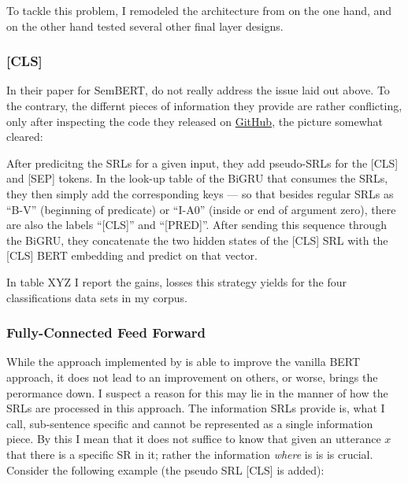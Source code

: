 To tackle this problem, I remodeled the architecture from \cite{zhang2019semantics} on the one hand, and on the other hand tested several other final layer designs.

\subsubsection{[CLS]}

In their paper for SemBERT, \cite{zhang2019semantics} do not really address the issue laid out above.
To the contrary, the differnt pieces of information they provide are rather conflicting, only after inspecting the code they released on \href{https://github.com/cooelf/SemBERT/}{GitHub}, the picture somewhat cleared:

After predicitng the SRLs for a given input, they add pseudo-SRLs for the [CLS] and [SEP] tokens.
In the look-up table of the BiGRU that consumes the SRLs, they then simply add the corresponding keys --- so that besides regular SRLs as ``B-V'' (beginning of predicate) or ``I-A0'' (inside or end of argument zero), there are also the labels ``[CLS]'' and ``[PRED]''.
After sending this sequence through the BiGRU, they concatenate the two hidden states of the [CLS] SRL with the [CLS] BERT embedding and predict on that vector.

In table XYZ I report the gains, losses this strategy yields for the four classifications data sets in my corpus.

\subsubsection{Fully-Connected Feed Forward}

While the approach implemented by \cite{zhang2019semantics} is able to improve the vanilla BERT approach, it does not lead to an improvement on others, or worse, brings the perormance down.
I suspect a reason for this may lie in the manner of how the SRLs are processed in this approach.
The information SRLs provide is, what I call, sub-sentence specific and cannot be represented as a single information piece.
By this I mean that it does not suffice to know that given an utterance $x$ that there is a specific SR in it; rather the information \emph{where} is is is crucial.
Consider the following example (the pseudo SRL [CLS] is added):

